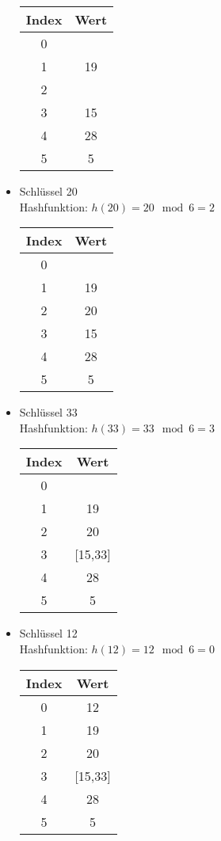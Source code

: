 \begin{multicols}{2}
\begin{itemize}
\begin{center}
\begin{tabular}{c|c}
Index & Wert \\
\hline
0 & \\
1 & 19\\
2 & \\
3 & 15\\
4 & 28\\
5 & 5\\
\end{tabular}
\end{center}

\item Schlüssel 20\\
Hashfunktion: $h(20) = 20 \mod 6 = 2$

\begin{center}
\begin{tabular}{c|c}
Index & Wert \\
\hline
0 & \\
1 & 19\\
2 & 20\\
3 & 15\\
4 & 28\\
5 & 5\\
\end{tabular}
\end{center}

\item Schlüssel 33\\
Hashfunktion: $h(33) = 33 \mod 6 = 3$

\begin{center}
\begin{tabular}{c|c}
Index & Wert \\
\hline
0 & \\
1 & 19\\
2 & 20\\
3 & [15,33]\\
4 & 28\\
5 & 5\\
\end{tabular}
\end{center}

\item Schlüssel 12\\
Hashfunktion: $h(12) = 12 \mod 6 = 0$

\begin{center}
\begin{tabular}{c|c}
Index & Wert \\
\hline
0 & 12\\
1 & 19\\
2 & 20\\
3 & [15,33]\\
4 & 28\\
5 & 5\\
\end{tabular}
\end{center}


\end{itemize}
\end{multicols}
